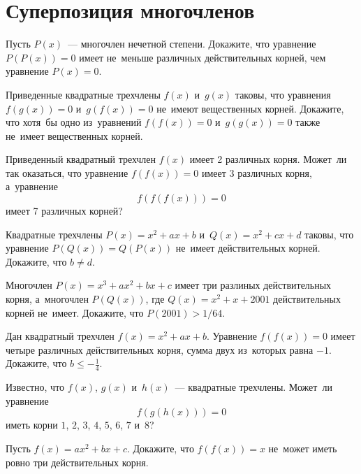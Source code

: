 
\section*{Суперпозиция многочленов}


\begin{problems}

\item
Пусть $P(x)$~--- многочлен нечетной степени.
Докажите, что уравнение $P(P(x)) = 0$ имеет не~меньше различных действительных
корней, чем уравнение $P(x) = 0$.

\item
Приведенные квадратные трехчлены $f(x)$ и~$g(x)$ таковы, что уравнения
$f(g(x)) = 0$ и~$g(f(x)) = 0$ не~имеют вещественных корней.
Докажите, что хотя~бы одно из~уравнений $f(f(x)) = 0$ и~$g(g(x)) = 0$ также
не~имеет вещественных корней.

\item
Приведенный квадратный трехчлен $f(x)$ имеет 2 различных корня.
Может~ли так оказаться, что уравнение $f(f(x)) = 0$ имеет 3 различных корня,
а~уравнение
\[
    f(f(f(x))) = 0
\]
имеет 7 различных корней?

\item
Квадратные трехчлены $P(x) = x^2 + a x + b$ и~$Q(x) = x^2 + c x + d$ таковы,
что уравнение $P(Q(x)) = Q(P(x))$ не~имеет действительных корней.
Докажите, что $b \neq d$.

\item
Многочлен $P(x) = x^3 + a x^2 + b x + c$ имеет три разлиных действительных
корня, а~многочлен $P(Q(x))$, где $Q(x) = x^2 + x + 2001$ действительных корней
не~имеет.
Докажите, что $P(2001) > 1 / 64$.

\item
Дан квадратный трехчлен $f(x) = x^2 + a x + b$.
Уравнение $f(f(x)) = 0$ имеет четыре различных действительных корня, сумма двух
из~которых равна $-1$.
Докажите, что $b \leq -\frac{1}{4}$.

\item
Известно, что $f(x)$, $g(x)$ и~$h(x)$~--- квадратные трехчлены.
Может~ли уравнение
\[
    f(g(h(x))) = 0
\]
иметь корни $1$, $2$, $3$, $4$, $5$, $6$, $7$ и~$8$?

\item
Пусть $f(x) = a x^2 + b x + c$.
Докажите, что $f(f(x)) = x$ не~может иметь ровно три действительных корня.

\end{problems}

